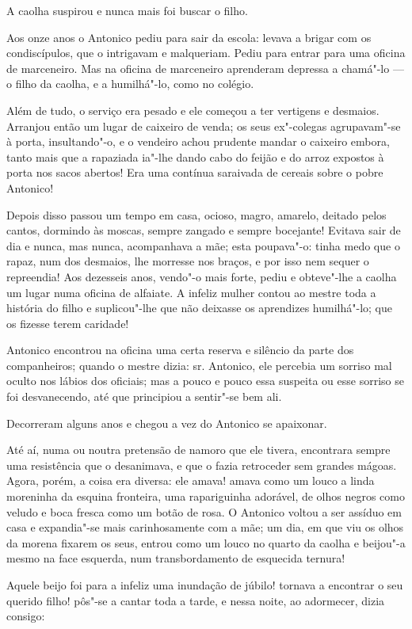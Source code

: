 A caolha suspirou e nunca mais foi buscar o filho.

Aos onze anos o Antonico pediu para sair da escola: levava a brigar com
os condiscípulos, que o intrigavam e malqueriam. Pediu para entrar para
uma oficina de marceneiro. Mas na oficina de marceneiro aprenderam
depressa a chamá"-lo --- o filho da caolha, e a humilhá"-lo, como no
colégio.

Além de tudo, o serviço era pesado e ele começou a ter vertigens e
desmaios. Arranjou então um lugar de caixeiro de venda; os seus
ex"-colegas agrupavam"-se à porta, insultando"-o, e o vendeiro achou
prudente mandar o caixeiro embora, tanto mais que a rapaziada ia"-lhe
dando cabo do feijão e do arroz expostos à porta nos sacos abertos! Era
uma contínua saraivada de cereais sobre o pobre Antonico!

Depois disso passou um tempo em casa, ocioso, magro, amarelo, deitado
pelos cantos, dormindo às moscas, sempre zangado e sempre bocejante!
Evitava sair de dia e nunca, mas nunca, acompanhava a mãe; esta
poupava"-o: tinha medo que o rapaz, num dos desmaios, lhe morresse nos
braços, e por isso nem sequer o repreendia! Aos dezesseis anos, vendo"-o
mais forte, pediu e obteve"-lhe a caolha um lugar numa oficina de
alfaiate. A infeliz mulher contou ao mestre toda a história do filho e
suplicou"-lhe que não deixasse os aprendizes humilhá"-lo; que os fizesse
terem caridade!

Antonico encontrou na oficina uma certa reserva e silêncio da parte dos
companheiros; quando o mestre dizia: sr. Antonico, ele percebia um
sorriso mal oculto nos lábios dos oficiais; mas a pouco e pouco essa
suspeita ou esse sorriso se foi desvanecendo, até que principiou a
sentir"-se bem ali.

Decorreram alguns anos e chegou a vez do Antonico se apaixonar.

Até aí, numa ou noutra pretensão de namoro que ele tivera, encontrara
sempre uma resistência que o desanimava, e que o fazia retroceder sem
grandes mágoas. Agora, porém, a coisa era diversa: ele amava! amava como
um louco a linda moreninha da esquina fronteira, uma rapariguinha
adorável, de olhos negros como veludo e boca fresca como um botão de
rosa. O Antonico voltou a ser assíduo em casa e expandia"-se mais
carinhosamente com a mãe; um dia, em que viu os olhos da morena fixarem
os seus, entrou como um louco no quarto da caolha e beijou"-a mesmo na
face esquerda, num transbordamento de esquecida ternura!

Aquele beijo foi para a infeliz uma inundação de júbilo! tornava a
encontrar o seu querido filho! pôs"-se a cantar toda a tarde, e nessa
noite, ao adormecer, dizia consigo:

